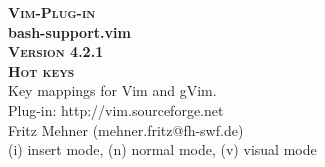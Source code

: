 \documentclass[oneside,11pt,landscape,DIV16]{scrartcl}
\newcommand{\Pluginversion}{4.2.1}
\begin{document}
%

\begin{multicols}{3}
%
\begin{center}
%
\textbf{\textsc{\small{Vim-Plug-in}}}\\
\textbf{\LARGE{bash-support.vim}}\\
\textbf{\textsc{\small{Version \Pluginversion}}}\\
\vspace{5mm}%
\textbf{\textsc{\Huge{Hot keys}}}\\ 
\vspace{5mm}%
Key mappings for Vim and gVim.\\
Plug-in: http://vim.sourceforge.net\\
Fritz Mehner (mehner.fritz@fh-swf.de)\\
\vspace{1.0mm}
{\normalsize (i)} insert mode, {\normalsize (n)} normal mode, {\normalsize (v)} visual mode\\
\vspace{4.0mm}


\end{center}
\end{multicols}
\end{document}
